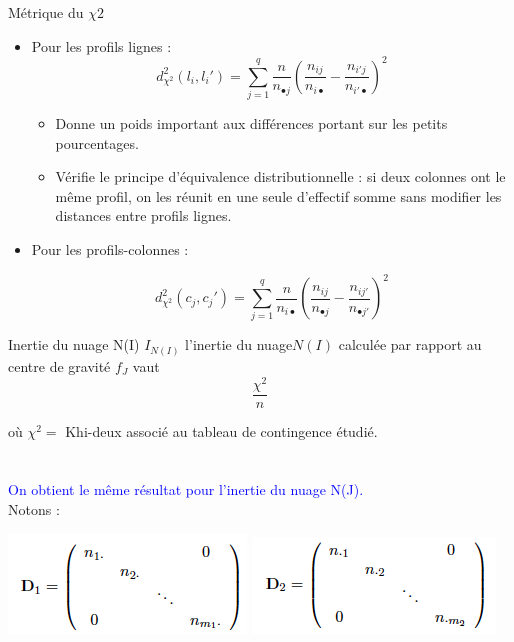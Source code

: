 \documentclass[10pt]{beamer}
\begin{document}
\begin{frame}{Métrique du $\chi 2$}

\begin{itemize}
\item Pour les profils lignes :\\

$$d^2_{\chi^2}(l_i,l_i')=\sum_{j=1}^{q}\frac{n}{n_{\bullet j}}(\frac{n_{ij}}{n_{i \bullet}}-\frac{n_{i'j}}{n_{i' \bullet}})^2  $$

\begin{itemize}
\item Donne un poids important aux différences portant sur les
petits pourcentages.
\item  Vérifie le principe d’équivalence distributionnelle : si deux
colonnes ont le même profil, on les réunit en une seule
d’effectif somme sans modifier les distances entre profils lignes.
\end{itemize}

\item Pour les profils-colonnes :

$$d^2_{\chi^2}(c_j,c_j')=\sum_{j=1}^{q}\frac{n}{n_{i \bullet }}(\frac{n_{ij}}{n_{\bullet j}}-\frac{n_{ij'}}{n_{ \bullet j'}})^2  $$       
       
\end{itemize}
\end{frame}
\begin{frame}{Inertie du nuage N(I)}
$I_{N(I)}$  l’inertie du nuage$ N(I)$ calculée par rapport
au centre de gravité $f_J$ vaut $$\frac{\chi^2}{n}$$

où $\chi^2=$ Khi-deux associé au tableau de contingence étudié.\\~\\~\\

\textcolor{blue}{On obtient le même résultat pour l’inertie du nuage N(J).} \\

Notons : 

\centering 

\includegraphics[scale=0.5]{D1.png} 
\includegraphics[scale=0.5]{D2.png} 

\end{frame}
\end{document}
